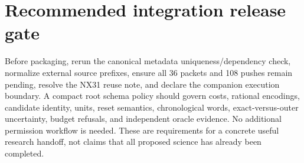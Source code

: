 \documentclass[
  11pt,
  a4paper,
]{report}
\begin{document}
\hypertarget{recommended-integration-release-gate}{%
\section{Recommended integration release
gate}\label{recommended-integration-release-gate}}

Before packaging, rerun the canonical metadata uniqueness/dependency
check, normalize external source prefixes, ensure all 36 packets and 108
pushes remain pending, resolve the NX31 reuse note, and declare the
companion execution boundary. A compact root schema policy should govern
costs, rational encodings, candidate identity, units, reset semantics,
chronological words, exact-versus-outer uncertainty, budget refusals,
and independent oracle evidence. No additional permission workflow is
needed. These are requirements for a concrete useful research handoff,
not claims that all proposed science has already been completed.
\end{document}
